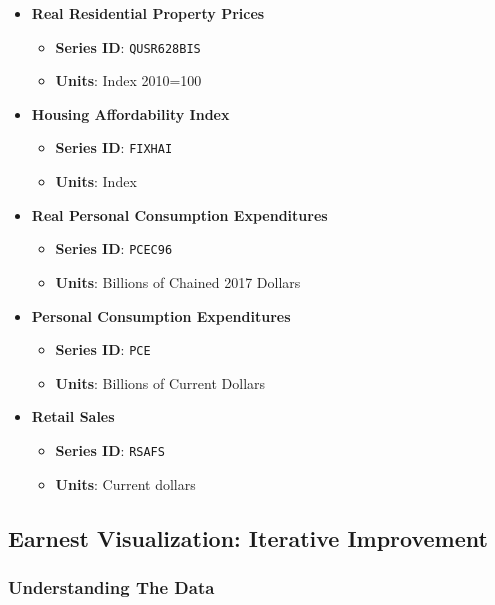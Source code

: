 \documentclass{article}
\begin{document}
\begin{itemize}
    \item \textbf{Real Residential Property Prices}
    \begin{itemize}
        \item \textbf{Series ID}: \texttt{QUSR628BIS}
        \item \textbf{Units}: Index 2010=100
    \end{itemize}
    
    \item \textbf{Housing Affordability Index}
    \begin{itemize}
        \item \textbf{Series ID}: \texttt{FIXHAI}
        \item \textbf{Units}: Index
    \end{itemize}
    
    \item \textbf{Real Personal Consumption Expenditures}
    \begin{itemize}
        \item \textbf{Series ID}: \texttt{PCEC96}
        \item \textbf{Units}: Billions of Chained 2017 Dollars
    \end{itemize}

    \item \textbf{Personal Consumption Expenditures}
    \begin{itemize}
        \item \textbf{Series ID}: \texttt{PCE}
        \item \textbf{Units}: Billions of Current Dollars
    \end{itemize}
    
    \item \textbf{Retail Sales}
    \begin{itemize}
        \item \textbf{Series ID}: \texttt{RSAFS}
        \item \textbf{Units}: Current dollars
    \end{itemize}

\end{itemize}    

\subsection{Earnest Visualization: Iterative Improvement}
\subsubsection{Understanding The Data}
\end{document}
